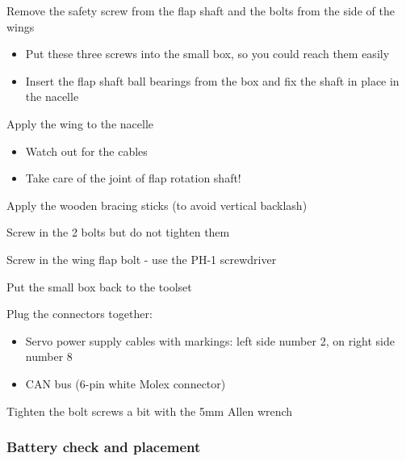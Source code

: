       \begin{todolist}
      \itemsep1pt\parskip0pt
      \item Remove the safety screw from the flap shaft and the bolts from the
        side of the wings

        \begin{itemize}
        \itemsep1pt\parskip0pt
        \item   Put these three screws into the small box, so you could reach them
          easily
        \item   Insert the flap shaft ball bearings from the box and fix the shaft
          in place in the nacelle
        \end{itemize}
      \item Apply the wing to the nacelle

        \begin{itemize}
        \itemsep1pt\parskip0pt
        \item   Watch out for the cables
        \item   Take care of the joint of flap rotation shaft!
        \end{itemize}
      \item Apply the wooden bracing sticks (to avoid vertical backlash)
      \item Screw in the 2 bolts but do not tighten them
      \item Screw in the wing flap bolt - use the PH-1 screwdriver
      \item Put the small box back to the toolset
      \item Plug the connectors together:

        \begin{itemize}
          \itemsep1pt\parskip0pt
          \item Servo power supply cables with markings: left side number 2, on
            right side number 8
          \item CAN bus (6-pin white Molex connector)
        \end{itemize}
      \item Tighten the bolt screws a bit with the 5mm Allen wrench
      \end{todolist}

\subsubsection*{Battery check and placement}\label{battery-check-and-placement}


